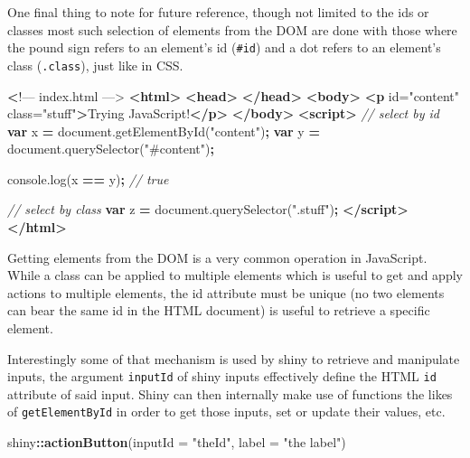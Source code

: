 \documentclass[
]{krantz}
\makeatletter
\newenvironment{Shaded}{\begin{snugshade}}{\end{snugshade}}
\newcommand{\AttributeTok}[1]{\textcolor[rgb]{0.61,0.61,0.61}{#1}}
\newcommand{\CommentTok}[1]{\textcolor[rgb]{0.37,0.37,0.37}{\textit{#1}}}
\newcommand{\DataTypeTok}[1]{\textcolor[rgb]{0.27,0.27,0.27}{#1}}
\newcommand{\ErrorTok}[1]{\textcolor[rgb]{0.14,0.14,0.14}{\textbf{#1}}}
\newcommand{\KeywordTok}[1]{\textcolor[rgb]{0.27,0.27,0.27}{\textbf{#1}}}
\newcommand{\NormalTok}[1]{#1}
\newcommand{\OperatorTok}[1]{\textcolor[rgb]{0.43,0.43,0.43}{\textbf{#1}}}
\newcommand{\OtherTok}[1]{\textcolor[rgb]{0.37,0.37,0.37}{#1}}
\newcommand{\StringTok}[1]{\textcolor[rgb]{0.5,0.5,0.5}{#1}}
\newcommand{\VariableTok}[1]{\textcolor[rgb]{0,0,0}{#1}}
\newenvironment{kframe}{%
\medskip{}
\setlength{\fboxsep}{.8em}
 \def\at@end@of@kframe{}%
 \ifinner\ifhmode%
  \def\at@end@of@kframe{\end{minipage}}%
  \begin{minipage}{\columnwidth}%
 \fi\fi%
 \def\FrameCommand##1{\hskip\@totalleftmargin \hskip-\fboxsep
 \colorbox{shadecolor}{##1}\hskip-\fboxsep
     \hskip-\linewidth \hskip-\@totalleftmargin \hskip\columnwidth}%
 \MakeFramed {\advance\hsize-\width
   \@totalleftmargin\z@ \linewidth\hsize
   \@setminipage}}%
 {\par\unskip\endMakeFramed%
 \at@end@of@kframe}
\renewenvironment{Shaded}{\begin{kframe}}{\end{kframe}}
\makeatother
\begin{document}
One final thing to note for future reference, though not limited to the ids or classes most such selection of elements from the DOM are done with those where the pound sign refers to an element's id (\texttt{\#id}) and a dot refers to an element's class (\texttt{.class}), just like in CSS.

\begin{Shaded}
\begin{Highlighting}[]
 \ErrorTok{<}\NormalTok{!–– index.html ––>}
\KeywordTok{<html>}
  \KeywordTok{<head>}
  \KeywordTok{</head>}
  \KeywordTok{<body>}
    \KeywordTok{<p}\OtherTok{ id=}\StringTok{"content"}\OtherTok{ class=}\StringTok{"stuff"}\KeywordTok{>}\NormalTok{Trying JavaScript!}\KeywordTok{</p>}
  \KeywordTok{</body>}
  \KeywordTok{<script>}
    \CommentTok{// select by id}
    \KeywordTok{var}\NormalTok{ x }\OperatorTok{=} \VariableTok{document}\NormalTok{.}\AttributeTok{getElementById}\NormalTok{(}\StringTok{"content"}\NormalTok{)}\OperatorTok{;}
    \KeywordTok{var}\NormalTok{ y }\OperatorTok{=} \VariableTok{document}\NormalTok{.}\AttributeTok{querySelector}\NormalTok{(}\StringTok{"\#content"}\NormalTok{)}\OperatorTok{;}

    \VariableTok{console}\NormalTok{.}\AttributeTok{log}\NormalTok{(x }\OperatorTok{==}\NormalTok{ y)}\OperatorTok{;} \CommentTok{// true}

    \CommentTok{// select by class}
    \KeywordTok{var}\NormalTok{ z }\OperatorTok{=} \VariableTok{document}\NormalTok{.}\AttributeTok{querySelector}\NormalTok{(}\StringTok{".stuff"}\NormalTok{)}\OperatorTok{;}
  \KeywordTok{</script>}
\KeywordTok{</html>}
\end{Highlighting}
\end{Shaded}

Getting elements from the DOM is a very common operation in JavaScript. While a class can be applied to multiple elements which is useful to get and apply actions to multiple elements, the id attribute must be unique (no two elements can bear the same id in the HTML document) is useful to retrieve a specific element.

Interestingly some of that mechanism is used by shiny to retrieve and manipulate inputs, the argument \texttt{inputId} of shiny inputs effectively define the HTML \texttt{id} attribute of said input. Shiny can then internally make use of functions the likes of \texttt{getElementById} in order to get those inputs, set or update their values, etc.

\begin{Shaded}
\begin{Highlighting}[]
\NormalTok{shiny}\OperatorTok{::}\KeywordTok{actionButton}\NormalTok{(}\DataTypeTok{inputId =} \StringTok{"theId"}\NormalTok{, }\DataTypeTok{label =} \StringTok{"the label"}\NormalTok{) }
\end{Highlighting}
\end{Shaded}
\end{document}
